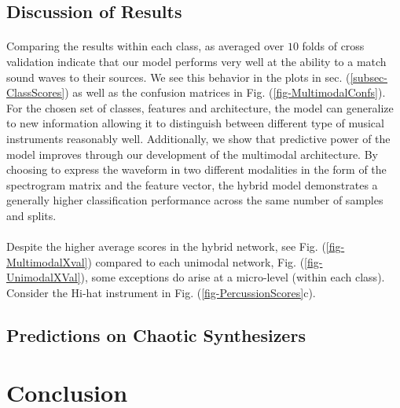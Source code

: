 \documentclass[12pt,letterpaper]{article}
\begin{document}

\subsection{Discussion of Results}

\paragraph*{}Comparing the results within each class, as averaged over $10$ folds of cross validation indicate that our model performs very well at the ability to a match sound waves to their sources. We see this behavior in the plots in sec. (\ref{subsec-ClassScores}) as well as the confusion matrices in Fig. (\ref{fig-MultimodalConfs}). For the chosen set of classes, features and architecture, the model can generalize to new information allowing it to distinguish between different type of musical instruments reasonably well. Additionally, we show that predictive power of the model improves through our development of the multimodal architecture. By choosing to express the waveform in two different modalities in the form of the spectrogram matrix and the feature vector, the hybrid model demonstrates a generally higher classification performance across the same number of samples and splits. 

\paragraph*{}Despite the higher average scores in the hybrid network, see Fig. (\ref{fig-MultimodalXval}) compared to each unimodal network, Fig. (\ref{fig-UnimodalXVal}), some exceptions do arise at a micro-level (within each class). Consider the Hi-hat instrument in Fig. (\ref{fig-PercussionScores}c).


\subsection{Predictions on Chaotic Synthesizers}



\newpage
\section{Conclusion}
\label{sec-Conclusion}
\end{document}

